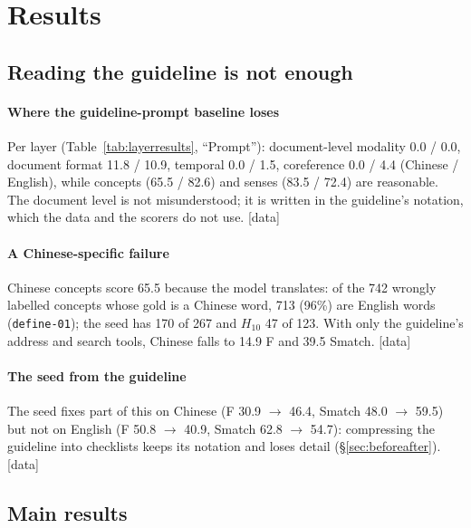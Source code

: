 \documentclass[11pt]{article}
\newcommand{\stag}[2]{\textcolor{#1}{\textsf{\scriptsize[#2]}}}
\newcommand{\HAVE}{\stag{green!50!black}{data}\xspace}
\begin{document}
\section{Results}
\label{sec:results}

\subsection{Reading the guideline is not enough}
\label{sec:diagnosis}

\paragraph{Where the guideline-prompt baseline loses}
Per layer (Table~\ref{tab:layerresults}, ``Prompt''): document-level modality 0.0 / 0.0, document format 11.8 / 10.9, temporal 0.0 / 1.5, coreference 0.0 / 4.4 (Chinese / English), while concepts (65.5 / 82.6) and senses (83.5 / 72.4) are reasonable. The document level is not misunderstood; it is written in the guideline's notation, which the data and the scorers do not use. \HAVE

\paragraph{A Chinese-specific failure}
Chinese concepts score 65.5 because the model translates: of the 742 wrongly labelled concepts whose gold is a Chinese word, 713 (96\%) are English words (\texttt{define-01}); the seed has 170 of 267 and $H_{10}$ 47 of 123. With only the guideline's address and search tools, Chinese falls to 14.9 F and 39.5 Smatch. \HAVE

\paragraph{The seed from the guideline}
The seed fixes part of this on Chinese (F 30.9 $\rightarrow$ 46.4, Smatch 48.0 $\rightarrow$ 59.5) but not on English (F 50.8 $\rightarrow$ 40.9, Smatch 62.8 $\rightarrow$ 54.7): compressing the guideline into checklists keeps its notation and loses detail (\S\ref{sec:beforeafter}). \HAVE

\subsection{Main results}
\label{sec:main}
\end{document}
